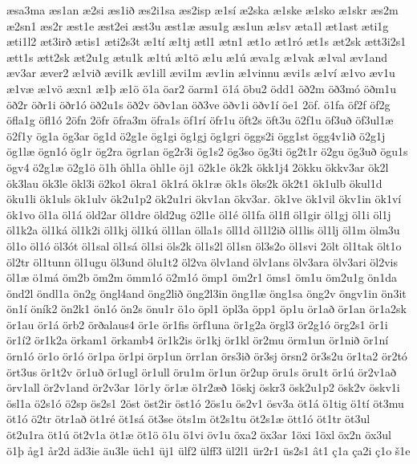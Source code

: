 {æsa3ma
æs1an
æ2si
æs1ið
æs2i1sa
æs2isp
æ1sí
æ2ska
æ1ske
æ1sko
æ1skr
æs2m
æ2sn1
æs2r
æst1e
æst2ei
æst3u
æst1æ
æsu1g
æs1un
æ1sv
æta1l
æt1ast
æti1g
æti1l2
æt3irð
ætis1
æti2s3t
æ1tí
æ1tj
ætl1
ætn1
æt1o
æt1ró
æt1s
æt2sk
ætt3i2s1
ætt1s
ætt2sk
æt2u1g
ætu1k
æ1tú
æ1tö
æ1u
æ1ú
æva1g
æ1vak
æ1val
æv1and
æv3ar
æver2
æ1við
ævi1k
æv1ill
ævi1m
æv1in
æ1vinnu
ævi1s
æ1ví
æ1vo
æv1u
æ1væ
æ1vö
æxn1
æ1þ
æ1ö
ö1a
öar2
öarm1
ö1á
öbu2
ödd1
öð2m
öð3mó
öðm1u
öð2r
öðr1i
öðr1ó
öð2u1s
öð2v
öðv1an
öð3ve
öðv1i
öðv1í
öe1
2öf.
ö1fa
öf2f
öf2g
öfla1g
öfl1ó
2öfn
2öfr
öfra3m
öfra1s
öf1rí
öfr1u
öft2s
öft3u
ö2f1u
öf3uð
öf3ul1æ
ö2f1y
ög1a
ög3ar
ög1d
ö2g1e
ög1gi
ög1gj
ög1gri
öggs2i
ögg1st
ögg4v1ið
ö2g1j
ög1læ
ögn1ó
ög1r
ög2ra
ögr1an
ög2r3i
ög1s2
ög3so
ög3ti
ög2t1r
ö2gu
ög3uð
ögu1s
ögv4
ö2g1æ
ö2g1ö
ö1h
öhl1a
öhl1e
öj1
ö2k1e
ök2k
ökk1j4
2ökku
ökkv3ar
ök2l
ök3lau
ök3le
ökl3i
ö2ko1
ökra1
ök1rá
ök1ræ
ök1s
öks2k
ök2t1
ök1ulb
ökul1d
öku1li
ök1uls
ök1ulv
ök2u1p2
ök2u1ri
ökv1an
ökv3ar.
ök1ve
ök1vil
ökv1in
ök1ví
ök1vo
öl1a
öl1á
öld2ar
öl1dre
öld2ug
ö2l1e
öl1é
öl1fa
öl1fl
öl1gir
öl1gj
öl1i
öl1j
öl1k2a
öl1ká
öl1k2i
öl1kj
öl1kú
öl1lan
ölla1s
öll1d
öl1l2ið
öl1lis
öl1lj
öl1m
ölm3u
öl1o
öl1ó
öl3ót
öl1sal
öl1sá
öl1si
öls2k
öl1s2l
öl1sn
öl3s2o
öl1svi
2ölt
öl1tak
ölt1o
öl2tr
öl1tunn
öl1ugu
öl3und
ölu1t2
öl2va
ölv1and
ölv1ans
ölv3ara
ölv3ari
öl2vis
öl1æ
ö1má
öm2b
öm2m
ömm1ó
ö2m1ó
ömp1
öm2r1
öms1
öm1u
öm2u1g
ön1da
önd2l
öndl1a
ön2g
öngl4and
öng2lið
öng2l3in
öng1læ
öng1sa
öng2v
öngv1in
ön3it
ön1í
öník2
ön2k1
ön1ó
ön2s
önu1r
ö1o
öpl1
öpl3a
öpp1
öp1u
ör1að
ör1an
ör1a2sk
ör1au
ör1á
örb2
örðalaus4
ör1e
ör1fis
örf1una
ör1g2a
örgl3
ör2g1ó
örg2s1
ör1i
ör1í2
ör1k2a
örkam1
örkamb4
ör1k2is
ör1kj
ör1kl
ör2mu
örm1un
ör1nið
ör1ní
örn1ó
ör1o
ör1ó
ör1pa
ör1pi
örp1un
örr1an
örs3ið
ör3sj
örsn2
ör3s2u
ör1ta2
ör2tó
ört3us
ör1t2v
ör1uð
ör1ugl
ör1ull
öru1m
ör1un
ör2up
öru1s
öru1t
ör1ú
ör2v1að
örv1all
ör2v1and
ör2v3ar
1ör1y
ör1æ
ö1r2æð
1öskj
öskr3
ösk2u1p2
ösk2v
öskv1i
ösl1a
ö2s1ó
ö2sp
ös2s1
2öst
öst2ir
öst1ó
2ös1u
ös2v1
ösv3a
öt1á
ö1tig
ö1tí
öt3mu
öt1ó
ö2tr
ötr1að
öt1ré
öt1sá
öt3se
öts1m
öt2s1tu
öt2s1æ
ött1ó
öt1tr
öt3ul
öt2u1ra
öt1ú
öt2v1a
öt1æ
öt1ö
ö1u
ö1vi
öv1u
öxa2
öx3ar
1öxi
1öxl
öx2n
öx3ul
ö1þ
åg1
år2d
äd3ie
äu3le
üch1
üj1
ülf2
ülff3
ül2l1
ür2r1
üs2s1
ât1
ç1a
ça2i
ç1o
š1e

}
